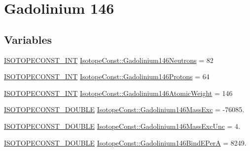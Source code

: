 \hypertarget{group___isotope_const-_gadolinium-_gd146}{}\section{Gadolinium 146}
\label{group___isotope_const-_gadolinium-_gd146}
\subsection*{Variables}
\begin{DoxyCompactItemize}
\item 
\mbox{\hyperlink{group___isotope_const-_macros_ga5f18360b3e99483a35c32d789e62621c}{I\+S\+O\+T\+O\+P\+E\+C\+O\+N\+S\+T\+\_\+\+I\+NT}} \mbox{\hyperlink{group___isotope_const-_gadolinium-_gd146_gae3d5287b835ff43161491ddb3512ad45}{Isotope\+Const\+::\+Gadolinium146\+Neutrons}} = 82
\item 
\mbox{\hyperlink{group___isotope_const-_macros_ga5f18360b3e99483a35c32d789e62621c}{I\+S\+O\+T\+O\+P\+E\+C\+O\+N\+S\+T\+\_\+\+I\+NT}} \mbox{\hyperlink{group___isotope_const-_gadolinium-_gd146_ga4dfdcd649695326f137e901ea112661c}{Isotope\+Const\+::\+Gadolinium146\+Protons}} = 64
\item 
\mbox{\hyperlink{group___isotope_const-_macros_ga5f18360b3e99483a35c32d789e62621c}{I\+S\+O\+T\+O\+P\+E\+C\+O\+N\+S\+T\+\_\+\+I\+NT}} \mbox{\hyperlink{group___isotope_const-_gadolinium-_gd146_ga2dd5f30d9568a7edc7ad712f345594a7}{Isotope\+Const\+::\+Gadolinium146\+Atomic\+Weight}} = 146
\item 
\mbox{\hyperlink{group___isotope_const-_macros_ga8f45a7272ce02c0b4c65c44636ed719a}{I\+S\+O\+T\+O\+P\+E\+C\+O\+N\+S\+T\+\_\+\+D\+O\+U\+B\+LE}} \mbox{\hyperlink{group___isotope_const-_gadolinium-_gd146_ga0191dc8597152a16aa24037af367c88f}{Isotope\+Const\+::\+Gadolinium146\+Mass\+Exc}} = -\/76085.
\item 
\mbox{\hyperlink{group___isotope_const-_macros_ga8f45a7272ce02c0b4c65c44636ed719a}{I\+S\+O\+T\+O\+P\+E\+C\+O\+N\+S\+T\+\_\+\+D\+O\+U\+B\+LE}} \mbox{\hyperlink{group___isotope_const-_gadolinium-_gd146_gade7dc7439112485a23ca6e4b5bf3401b}{Isotope\+Const\+::\+Gadolinium146\+Mass\+Exc\+Unc}} = 4.
\item 
\mbox{\hyperlink{group___isotope_const-_macros_ga8f45a7272ce02c0b4c65c44636ed719a}{I\+S\+O\+T\+O\+P\+E\+C\+O\+N\+S\+T\+\_\+\+D\+O\+U\+B\+LE}} \mbox{\hyperlink{group___isotope_const-_gadolinium-_gd146_gaa47f9168468053b71ddb8d7d7d9c6152}{Isotope\+Const\+::\+Gadolinium146\+Bind\+E\+PerA}} = 8249.

\end{DoxyCompactItemize}
